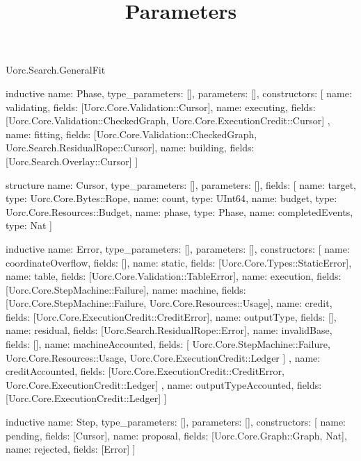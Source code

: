 \begin{lexlean}{Uorc.Search.GeneralFit}
\title{Parameters}
\begin{semanticmodule}
inductive{
  name: Phase,
  type_parameters: [],
  parameters: [],
  constructors: [
    {name: validating, fields: [Uorc.Core.Validation::Cursor]},
    {
      name: executing,
      fields: [Uorc.Core.Validation::CheckedGraph, Uorc.Core.ExecutionCredit::Cursor]
    },
    {name: fitting, fields: [Uorc.Core.Validation::CheckedGraph, Uorc.Search.ResidualRope::Cursor]},
    {name: building, fields: [Uorc.Search.Overlay::Cursor]}
  ]
}

structure{
  name: Cursor,
  type_parameters: [],
  parameters: [],
  fields: [
    {name: target, type: Uorc.Core.Bytes::Rope},
    {name: count, type: UInt64},
    {name: budget, type: Uorc.Core.Resources::Budget},
    {name: phase, type: Phase},
    {name: completedEvents, type: Nat}
  ]
}

inductive{
  name: Error,
  type_parameters: [],
  parameters: [],
  constructors: [
    {name: coordinateOverflow, fields: []},
    {name: static, fields: [Uorc.Core.Types::StaticError]},
    {name: table, fields: [Uorc.Core.Validation::TableError]},
    {name: execution, fields: [Uorc.Core.StepMachine::Failure]},
    {name: machine, fields: [Uorc.Core.StepMachine::Failure, Uorc.Core.Resources::Usage]},
    {name: credit, fields: [Uorc.Core.ExecutionCredit::CreditError]},
    {name: outputType, fields: []},
    {name: residual, fields: [Uorc.Search.ResidualRope::Error]},
    {name: invalidBase, fields: []},
    {
      name: machineAccounted,
      fields: [
        Uorc.Core.StepMachine::Failure,
        Uorc.Core.Resources::Usage,
        Uorc.Core.ExecutionCredit::Ledger
      ]
    },
    {
      name: creditAccounted,
      fields: [Uorc.Core.ExecutionCredit::CreditError, Uorc.Core.ExecutionCredit::Ledger]
    },
    {name: outputTypeAccounted, fields: [Uorc.Core.ExecutionCredit::Ledger]}
  ]
}

inductive{
  name: Step,
  type_parameters: [],
  parameters: [],
  constructors: [
    {name: pending, fields: [Cursor]},
    {name: proposal, fields: [Uorc.Core.Graph::Graph, Nat]},
    {name: rejected, fields: [Error]}
  ]
}


\end{semanticmodule}
\end{lexlean}
